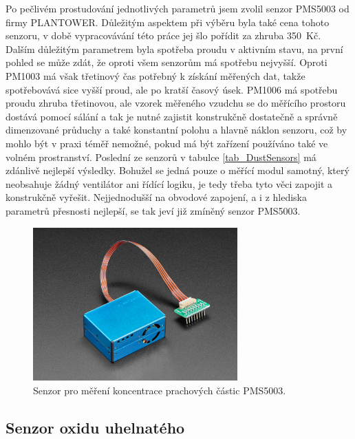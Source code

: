Po pečlivém prostudování jednotlivých parametrů jsem zvolil senzor PMS5003 od firmy PLANTOWER. Důležitým aspektem při výběru byla také cena tohoto senzoru, v době vypracovávání této práce jej šlo pořídit za zhruba 350~Kč. Dalším důležitým parametrem byla spotřeba proudu v aktivním stavu, na první pohled se může zdát, že oproti všem senzorům má spotřebu nejvyšší. Oproti PM1003 má však třetinový čas potřebný k získání měřených dat, takže spotřebovává sice vyšší proud, ale po kratší časový úsek. PM1006 má spotřebu proudu zhruba třetinovou, ale vzorek měřeného vzudchu se do měřícího prostoru dostává pomocí sálání a tak je nutné zajistit konstrukčně dostatečně a správně dimenzované průduchy a také konstantní polohu a hlavně náklon senzoru, což by mohlo být v praxi téměř nemožné, pokud má být zařízení používáno také ve volném prostranství. Poslední ze senzorů v tabulce \ref{tab_DustSensors} má zdánlivě nejlepší výsledky. Bohužel se jedná pouze o měřící modul samotný, který neobsahuje žádný ventilátor ani řídící logiku, je tedy třeba tyto věci zapojit a konstrukčně vyřešit. Nejjednodušší na obvodové zapojení, a i z hlediska parametrů přesnosti nejlepší, se tak jeví již zmíněný senzor PMS5003.

\begin{figure}
    \centering
    \includegraphics[width=0.7\textwidth]{obrazky/PMS5003.jpg}
    \caption{Senzor pro měření koncentrace prachových částic PMS5003. \cite{dat_PMS5003}}
    \label{fig_PMS5003}
\end{figure}

\subsection{Senzor oxidu uhelnatého}

